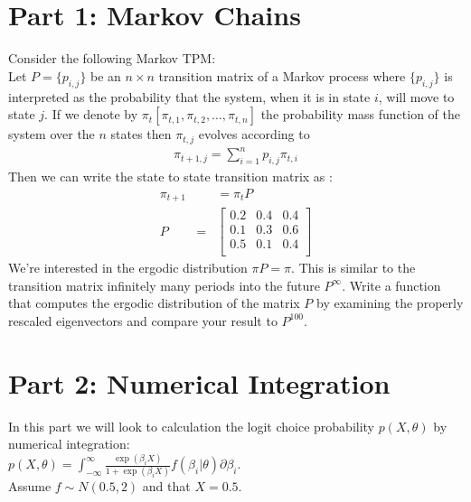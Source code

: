 \documentclass{article}
\begin{document}
\section*{Part 1: Markov Chains}
Consider the following Markov TPM:\\
Let $P = \{p_{i,j} \}$ be an $n \times n$ transition matrix of a Markov process where $\{p_{i,j} \}$ is interpreted as the probability that the system, when it is in state $i$, will move to state $j$. If we denote by $\pi_t [ \pi_{t,1} , \pi_{t,2}, \ldots, \pi_{t,n}]$ the probability mass function of the system over the $n$ states then $\pi_{t,j}$ evolves according to 
\begin{eqnarray*}
\pi_{t+1,j} = \sum_{i=1}^n p_{i,j} \pi_{t,i}
\end{eqnarray*}
Then we can write the state to state transition matrix as :
\begin{eqnarray*}
\pi_{t+1}& &= \pi_t P \\
P &=&
\left[ {\begin{array}{ccc}
    0.2&    0.4&    0.4\\
    0.1&    0.3&    0.6\\
    0.5&    0.1&    0.4\\
 \end{array} } \right]
\end{eqnarray*}
We're interested in the ergodic distribution $\pi P = \pi$. This is similar to the transition matrix infinitely many periods into the future $P^{\infty}$. Write a function that computes the ergodic distribution of the matrix $P$ by examining the properly rescaled eigenvectors and compare your result to $P^{100}$.
\section*{Part 2: Numerical Integration}
In this part we will look to calculation the logit choice probability $p(X,\theta)$ by numerical integration:\\
 $p(X,\theta) =\int_{-\infty}^{\infty} \frac{\exp(\beta_i X)}{1+ \exp(\beta_i X)} f(\beta_i | \theta) \partial \beta_i$. \\
 Assume $f \sim N(0.5,2)$ and that $X = 0.5$.
 
\end{document}
